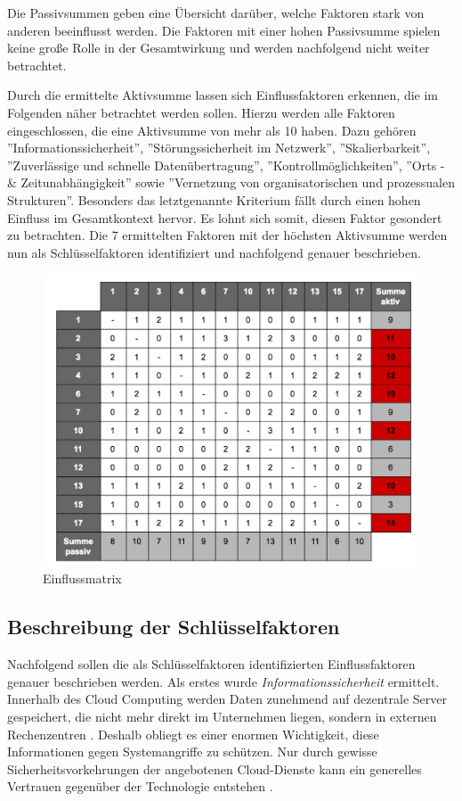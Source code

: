 Die Passivsummen geben eine Übersicht darüber, welche Faktoren stark von anderen beeinflusst werden. Die Faktoren mit einer hohen Passivsumme spielen keine große Rolle in der Gesamtwirkung und werden nachfolgend nicht weiter betrachtet.

Durch die ermittelte Aktivsumme lassen sich Einflussfaktoren erkennen, die im Folgenden näher betrachtet werden sollen. Hierzu werden alle Faktoren eingeschlossen, die eine Aktivsumme von mehr als 10 haben. Dazu gehören ''Informationssicherheit'', ''Störungssicherheit im Netzwerk'', ''Skalierbarkeit'', ''Zuverlässige und schnelle Datenübertragung'', ''Kontrollmöglichkeiten'', ''Orts - \& Zeitunabhängigkeit'' sowie ''Vernetzung von organisatorischen und prozessualen Strukturen''. Besonders das letztgenannte Kriterium fällt durch einen hohen Einfluss im Gesamtkontext hervor. Es lohnt sich somit, diesen Faktor gesondert zu betrachten. Die 7 ermittelten Faktoren mit der höchsten Aktivsumme werden nun als Schlüsselfaktoren identifiziert und nachfolgend genauer beschrieben.

\begin{figure}
	\centering
	\includegraphics[width=\linewidth]{images/matrix}
	\caption[Caption for parameters]{Einflussmatrix}
	\label{fig:matrix}
\end{figure}

\subsection{Beschreibung der Schlüsselfaktoren}

Nachfolgend sollen die als Schlüsselfaktoren identifizierten Einflussfaktoren genauer beschrieben werden. Als erstes wurde \textit{Informationssicherheit} ermittelt. Innerhalb des Cloud Computing werden Daten zunehmend auf dezentrale Server gespeichert, die nicht mehr direkt im Unternehmen liegen, sondern in externen Rechenzentren \cite{krcmar}. Deshalb obliegt es einer enormen Wichtigkeit, diese Informationen gegen Systemangriffe zu schützen. Nur durch gewisse Sicherheitsvorkehrungen der angebotenen Cloud-Dienste kann ein generelles Vertrauen gegenüber der Technologie entstehen \cite{gebauer}.

